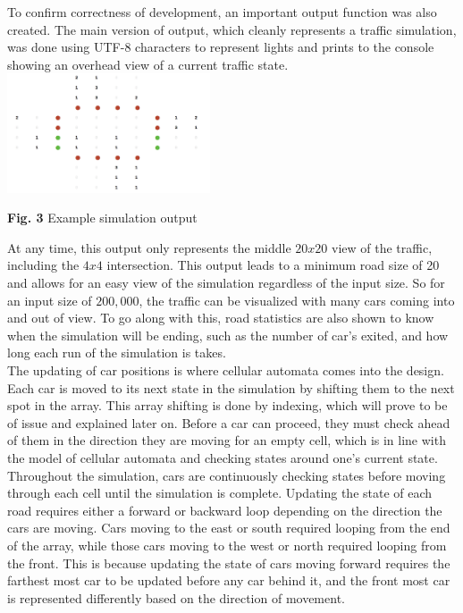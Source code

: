 \documentclass[conference]{IEEEtran}
\begin{document}
\hspace*{.2cm} To confirm correctness of development, an important output function was also created. The main version of output, which cleanly represents a traffic simulation, was done using UTF-8 characters to represent lights and prints to the console showing an overhead view of a current traffic state. \\

\includegraphics[width=0.45\textwidth]{images/output}
\begin{center}
	\textbf{Fig. 3} Example simulation output  \\
\end{center}


At any time, this output only represents the middle $20x20$ view of the traffic, including the $4x4$ intersection. This output leads to a minimum road size of 20 and allows for an easy view of the simulation regardless of the input size. So for an input size of $200,000$, the traffic can be visualized with many cars coming into and out of view. To go along with this, road statistics are also shown to know when the simulation will be ending, such as the number of car's exited, and how long each run of the simulation is takes. \\

\hspace*{.2cm} The updating of car positions is where cellular automata comes into the design. Each car is moved to its next state in the simulation by shifting them to the next spot in the array. This array shifting is done by indexing, which will prove to be of issue and explained later on. Before  a car can proceed, they must check ahead of them in the direction they are moving for an empty cell, which is in line with the model of cellular automata and checking states around one's current state. Throughout the simulation, cars are continuously checking states before moving through each cell until the simulation is complete. Updating the state of each road requires either a forward or backward loop depending on the direction the cars are moving. Cars moving to the east or south required looping from the end of the array, while those cars moving to the west or north required looping from the front. This is because updating the state of cars moving forward   requires the farthest most car to be updated before any car behind it, and the front most car is represented differently based on the direction of movement.\\
\end{document}
